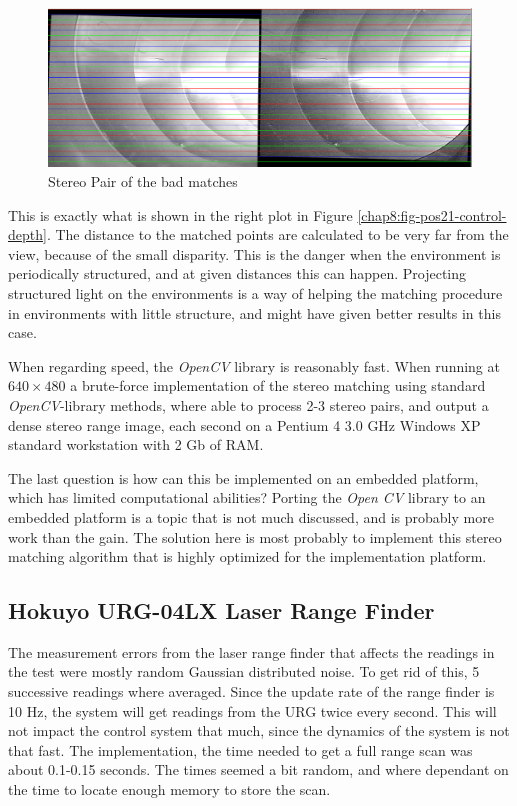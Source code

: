 \begin{figure}[htbp]
    \centering
    \includegraphics[width=\textwidth]{pics/pos21-control-rectified}
    \caption{Stereo Pair of the bad matches}
    \label{chap8:fig-pos21-control-rectified}
\end{figure}
This is exactly what is shown in the right plot in Figure
\ref{chap8:fig-pos21-control-depth}. The distance to the matched points are calculated to
be very far from the view, because of the small disparity. This is the danger when the
environment is periodically structured, and at given distances this can happen.
Projecting structured light on the environments is a way of helping the matching procedure
in environments with little structure, and might have given better results in this case. 

When regarding speed, the \emph{OpenCV} library is reasonably fast. When running at
$640\times480$ a brute-force implementation of the stereo matching using standard
\emph{OpenCV}-library methods, where able to process 2-3 stereo pairs, and
output a dense stereo range image, each second on a Pentium 4 3.0 GHz Windows XP 
standard workstation with 2 Gb of RAM. 

The last question is how can this be implemented on an embedded platform, which has limited
computational abilities? Porting the \emph{Open CV} library to an embedded platform is a
topic that is not much discussed, and is probably more work than the gain. The solution
here is most probably to implement this stereo matching algorithm that is highly optimized
for the implementation platform. 




\subsection{Hokuyo URG-04LX Laser Range Finder}
The measurement errors from the laser range finder that affects the readings in the test were
mostly random Gaussian distributed noise. To get rid of this, 5 successive
readings where averaged. Since the update rate of the range finder is 10 Hz, the system
will get readings from the URG twice every second. This will not impact the control system
that much, since the dynamics of the system is not that fast. The implementation, the time
needed to get a full range scan was about 0.1-0.15 seconds. The times seemed a bit random,
and where dependant on the time to locate enough memory to store the scan. 

